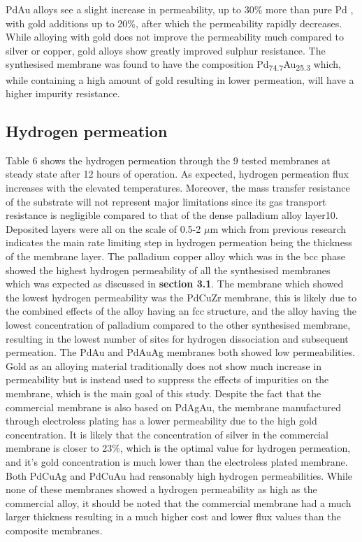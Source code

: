 PdAu alloys see a slight increase in permeability, up to 30\% more than pure Pd \cite{Atsonios2015}, with gold additions up to 20\%, after which the permeability rapidly decreases. While alloying with gold does not improve the permeability much compared to silver or copper, gold alloys show greatly improved sulphur resistance. \cite{Chen2010} The synthesised membrane was found to have the composition  Pd\textsubscript{74.7}Au\textsubscript{25.3} which, while containing a high amount of gold resulting in lower permeation, will have a higher impurity resistance. 

\subsection{Hydrogen permeation}
Table 6 shows the hydrogen permeation through the 9 tested membranes at steady state after 12 hours of operation. As expected, hydrogen permeation flux increases with the elevated temperatures. Moreover, the mass transfer resistance of the substrate will not represent major limitations since its gas transport resistance is negligible compared to that of the dense palladium alloy layer10. Deposited layers were all on the scale of 0.5-2 $\mu$m which from previous research indicates the main rate limiting step in hydrogen permeation being the thickness of the membrane layer. \cite{NathanW.Ockwig2007a} The palladium copper alloy which was in the bcc phase showed the highest hydrogen permeability of all the synthesised membranes which was expected as discussed in \textbf{section 3.1}. The membrane which showed the lowest hydrogen permeability was the PdCuZr membrane, this is likely due to the combined effects of the alloy having an fcc structure, and the alloy having the lowest concentration of palladium compared to the other synthesised membrane, resulting in the lowest number of sites for hydrogen dissociation and subsequent permeation. The PdAu and PdAuAg membranes both showed low permeabilities. Gold as an alloying material traditionally does not show much increase in permeability \cite{Chen2010}  but is instead used to suppress the effects of impurities on the membrane, \cite{Chen2010} which is the main goal of this study. Despite the fact that the commercial membrane is also based on PdAgAu, the membrane manufactured through electroless plating has a lower permeability due to the high gold concentration. It is likely that the concentration of silver in the commercial membrane is closer to 23\%, which is the optimal value for hydrogen permeation, and it’s gold concentration is much lower than the electroless plated membrane. Both PdCuAg and PdCuAu had reasonably high hydrogen permeabilities. While none of these membranes showed a hydrogen permeability as high as the commercial alloy, it should be noted that the commercial membrane had a much larger thickness resulting in a much higher cost and lower flux values than the composite membranes. 

